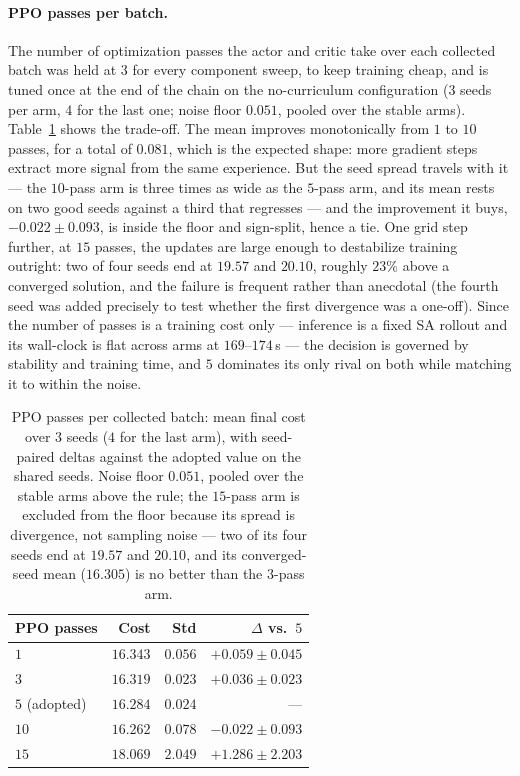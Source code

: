 \documentclass[letterpaper]{article} %
\begin{document}
\paragraph{PPO passes per batch.}
The number of optimization passes the actor and critic take over each collected batch was held at $3$ for every component sweep, to keep training cheap, and is tuned once at the end of the chain on the no-curriculum configuration ($3$ seeds per arm, $4$ for the last one; noise floor $0.051$, pooled over the stable arms). Table~\ref{tab:xppo} shows the trade-off. The mean improves monotonically from $1$ to $10$ passes, for a total of $0.081$, which is the expected shape: more gradient steps extract more signal from the same experience. But the seed spread travels with it --- the $10$-pass arm is three times as wide as the $5$-pass arm, and its mean rests on two good seeds against a third that regresses --- and the improvement it buys, $-0.022 \pm 0.093$, is inside the floor and sign-split, hence a tie. One grid step further, at $15$ passes, the updates are large enough to destabilize training outright: two of four seeds end at $19.57$ and $20.10$, roughly $23\%$ above a converged solution, and the failure is frequent rather than anecdotal (the fourth seed was added precisely to test whether the first divergence was a one-off). Since the number of passes is a training cost only --- inference is a fixed SA rollout and its wall-clock is flat across arms at $169$--$174$\,s --- the decision is governed by stability and training time, and $5$ dominates its only rival on both while matching it to within the noise.

\begin{table}[t]
\centering
\small
\begin{tabular}{lrrr}
\toprule
\textbf{PPO passes} & \textbf{Cost} & \textbf{Std} & \textbf{$\Delta$ vs.\ $5$} \\
\midrule
$1$  & $16.343$ & $0.056$ & $+0.059 \pm 0.045$ \\
$3$  & $16.319$ & $0.023$ & $+0.036 \pm 0.023$ \\
$5$ (adopted)  & $\mathbf{16.284}$ & $0.024$ & --- \\
$10$ & $16.262$ & $0.078$ & $-0.022 \pm 0.093$ \\
\midrule
$15$ & $18.069$ & $2.049$ & $+1.286 \pm 2.203$ \\
\bottomrule
\end{tabular}
\caption{PPO passes per collected batch: mean final cost over $3$ seeds ($4$ for the last arm), with seed-paired deltas against the adopted value on the shared seeds. Noise floor $0.051$, pooled over the stable arms above the rule; the $15$-pass arm is excluded from the floor because its spread is divergence, not sampling noise --- two of its four seeds end at $19.57$ and $20.10$, and its converged-seed mean ($16.305$) is no better than the $3$-pass arm.}
\label{tab:xppo}
\end{table}
\end{document}

